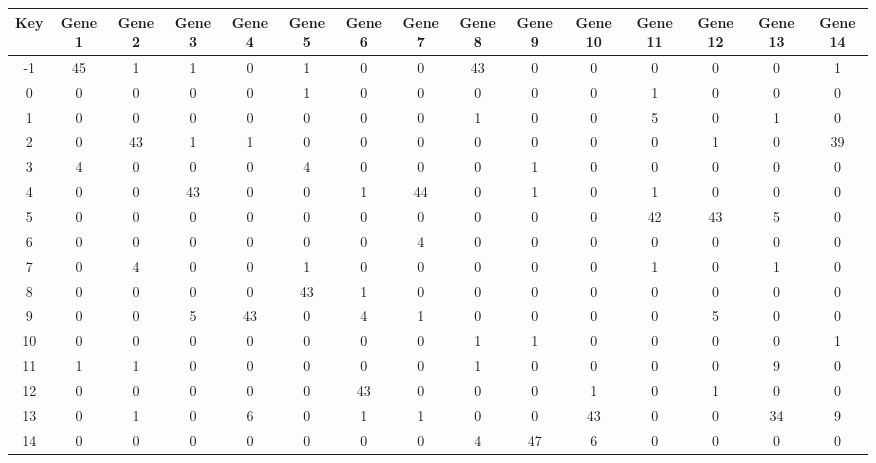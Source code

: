 \begin{tabular}{|c|c|c|c|c|c|c|c|c|c|c|c|c|c|c|}
\hline
Key & Gene 1 & Gene 2 & Gene 3 & Gene 4 & Gene 5 & Gene 6 & Gene 7 & Gene 8 & Gene 9 & Gene 10 & Gene 11 & Gene 12 & Gene 13 & Gene 14 \\
\hline
-1 & 45 & 1 & 1 & 0 & 1 & 0 & 0 & 43 & 0 & 0 & 0 & 0 & 0 & 1 \\
0 & 0 & 0 & 0 & 0 & 1 & 0 & 0 & 0 & 0 & 0 & 1 & 0 & 0 & 0 \\
1 & 0 & 0 & 0 & 0 & 0 & 0 & 0 & 1 & 0 & 0 & 5 & 0 & 1 & 0 \\
2 & 0 & 43 & 1 & 1 & 0 & 0 & 0 & 0 & 0 & 0 & 0 & 1 & 0 & 39 \\
3 & 4 & 0 & 0 & 0 & 4 & 0 & 0 & 0 & 1 & 0 & 0 & 0 & 0 & 0 \\
4 & 0 & 0 & 43 & 0 & 0 & 1 & 44 & 0 & 1 & 0 & 1 & 0 & 0 & 0 \\
5 & 0 & 0 & 0 & 0 & 0 & 0 & 0 & 0 & 0 & 0 & 42 & 43 & 5 & 0 \\
6 & 0 & 0 & 0 & 0 & 0 & 0 & 4 & 0 & 0 & 0 & 0 & 0 & 0 & 0 \\
7 & 0 & 4 & 0 & 0 & 1 & 0 & 0 & 0 & 0 & 0 & 1 & 0 & 1 & 0 \\
8 & 0 & 0 & 0 & 0 & 43 & 1 & 0 & 0 & 0 & 0 & 0 & 0 & 0 & 0 \\
9 & 0 & 0 & 5 & 43 & 0 & 4 & 1 & 0 & 0 & 0 & 0 & 5 & 0 & 0 \\
10 & 0 & 0 & 0 & 0 & 0 & 0 & 0 & 1 & 1 & 0 & 0 & 0 & 0 & 1 \\
11 & 1 & 1 & 0 & 0 & 0 & 0 & 0 & 1 & 0 & 0 & 0 & 0 & 9 & 0 \\
12 & 0 & 0 & 0 & 0 & 0 & 43 & 0 & 0 & 0 & 1 & 0 & 1 & 0 & 0 \\
13 & 0 & 1 & 0 & 6 & 0 & 1 & 1 & 0 & 0 & 43 & 0 & 0 & 34 & 9 \\
14 & 0 & 0 & 0 & 0 & 0 & 0 & 0 & 4 & 47 & 6 & 0 & 0 & 0 & 0 \\
\hline
\end{tabular}